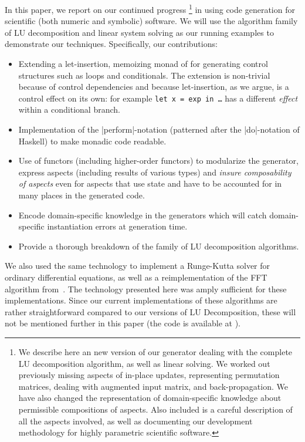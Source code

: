 \documentclass[draft]{elsart}
\begin{document}
In this paper, we report on our continued progress \cite{CaretteKiselyov05}
\footnote{We describe here an new version of our generator
  dealing with the complete LU decomposition algorithm, as well as
  linear solving. We worked out previously missing aspects of in-place
  updates, representing permutation matrices, dealing with augmented 
  input matrix, and back-propagation. We have also changed the representation
  of domain-specific knowledge about permissible compositions of aspects.
  Also included is a careful description of all the aspects involved, as
  well as documenting our development methodology for highly parametric
  scientific software.}
in using code generation for scientific (both numeric and symbolic)
software.  We will use the algorithm family of LU decomposition 
and linear system solving as our running examples to demonstrate our
techniques.  Specifically, our contributions:
\begin{itemize}
    \item Extending a let-insertion, memoizing monad of
      \cite{KiselyovTaha,MSP:PADL04} for generating control structures
      such as loops and conditionals. The extension is non-trivial
	  because of control dependencies and because let-insertion, as we argue,
	  is a control effect on its own: for example
      \texttt{let x = exp in \dots} has a different \emph{effect} within a
      conditional branch.
    \item Implementation of the |perform|-notation (patterned after
      the |do|-notation of Haskell) to make monadic code readable.
    \item Use of functors (including higher-order functors) to
      modularize the generator, express aspects (including results of
      various types) and \emph{insure composability of aspects} even
      for aspects that use state and have to be accounted for in many
      places in the generated code.
    \item Encode domain-specific knowledge in the generators which 
      will catch domain-specific instantiation errors at generation
      time.
    \item Provide a thorough breakdown of the family of LU decomposition
      algorithms.
\end{itemize}

We also used the same technology to implement a Runge-Kutta solver for
ordinary differential equations, as well as a reimplementation of
the FFT algorithm from~\cite{KiselyovTaha}.  The technology presented
here was amply sufficient for these implementations.  Since our current
implementations of these algorithms are rather straightforward compared to 
our versions of LU Decomposition, these will not be mentioned further
in this paper (the code is available at \cite{metamonadsURL}).
\end{document}
